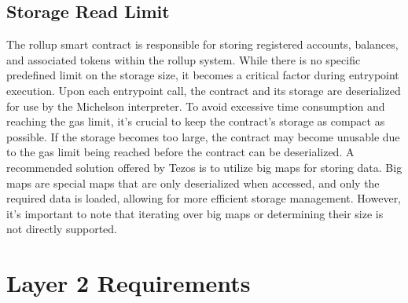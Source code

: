 \subsection{Storage Read Limit}

The rollup smart contract is responsible for storing registered accounts, balances, and associated tokens within the rollup system. While there is no specific predefined limit on the storage size, it becomes a critical factor during entrypoint execution. Upon each entrypoint call, the contract and its storage are deserialized for use by the Michelson interpreter. To avoid excessive time consumption and reaching the gas limit, it's crucial to keep the contract's storage as compact as possible. If the storage becomes too large, the contract may become unusable due to the gas limit being reached before the contract can be deserialized. A recommended solution offered by Tezos is to utilize big maps for storing data. Big maps are special maps that are only deserialized when accessed, and only the required data is loaded, allowing for more efficient storage management. However, it's important to note that iterating over big maps or determining their size is not directly supported.

\section{Layer 2 Requirements}

